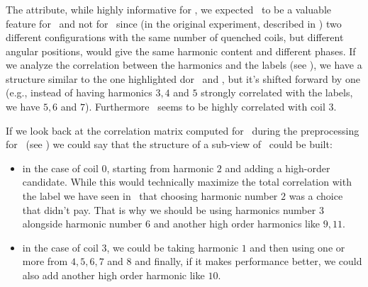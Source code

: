 \subsubsection{\cnmod}
The \cnmod attribute, while highly informative for \qrp, we expected \cnmod\ to be a valuable feature for \qrp\
and not for \qlp\ since (in the original experiment, described in ) two different
configurations with the same number of quenched coils, but different angular positions, would give
the same harmonic content and different phases. If we analyze the correlation between the harmonics
and the labels (see \Cref{fig:cnmod-lcorr-qlp}), we have a structure similar to the one highlighted dor \an\ and \bn, but it's
shifted forward by one (e.g., instead of having harmonics $3, 4$ and $5$ strongly correlated with
the labels, we have $5, 6$ and $7$). Furthermore \cnmod\ seems to be highly correlated with coil
$3$.

If we look back at the correlation matrix computed for \cnmod\ during the preprocessing for \qrp\
(see ) we could say that the structure of a sub-view of \cnmod\ could be built:
\begin{itemize}
	\item in the case of coil $0$, starting from harmonic $2$ and adding a high-order candidate.
	      While this would technically maximize the total correlation with the label we have
	      seen in \qrp\ that choosing harmonic number $2$ was a choice that didn't pay. That
	      is why we should be using harmonics number $3$ alongside harmonic number $6$ and
	      another high order harmonics like $9, 11$.
	\item in the case of coil $3$, we could be taking harmonic $1$ and then using one or more from $4,
		      5, 6, 7$ and $8$ and finally, if it makes performance better, we could also add
	      another high order harmonic like $10$.
\end{itemize}

